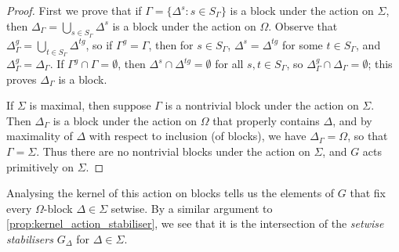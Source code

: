 \begin{proof}
    First we prove that if $\Gamma = \{\Delta^s : s \in S_\Gamma\}$ is a block under the action on $\Sigma$, then $\Delta_\Gamma = \bigcup_{s \in S_\Gamma} \Delta^s$ is a block under the action on $\Omega$. Observe that $\Delta_\Gamma^g = \bigcup_{t \in S_\Gamma} \Delta^{tg}$, so if $\Gamma^g = \Gamma$, then for $s \in S_\Gamma$, $\Delta^s = \Delta^{tg}$ for some $t \in S_\Gamma$, and $\Delta_\Gamma^g = \Delta_\Gamma$. If $\Gamma^g \cap \Gamma = \emptyset$, then $\Delta^s \cap \Delta^{tg} = \emptyset$ for all $s,t \in S_\Gamma$, so $\Delta_\Gamma^g \cap \Delta_\Gamma = \emptyset$; this proves $\Delta_\Gamma$ is a block.

    If $\Sigma$ is maximal, then suppose $\Gamma$ is a nontrivial block under the action on $\Sigma$. Then $\Delta_\Gamma$ is a block under the action on $\Omega$ that properly contains $\Delta$, and by maximality of $\Delta$ with respect to inclusion (of blocks), we have $\Delta_\Gamma = \Omega$, so that $\Gamma = \Sigma$. Thus there are no nontrivial blocks under the action on $\Sigma$, and $G$ acts primitively on $\Sigma$.
\end{proof}

Analysing the kernel of this action on blocks tells us the elements of $G$ that fix every $\Omega$-block $\Delta \in \Sigma$ setwise. By a similar argument to \autoref{prop:kernel_action_stabiliser}, we see that it is the intersection of the \textit{setwise stabilisers} $G_{\Delta}$ for $\Delta \in \Sigma$.

